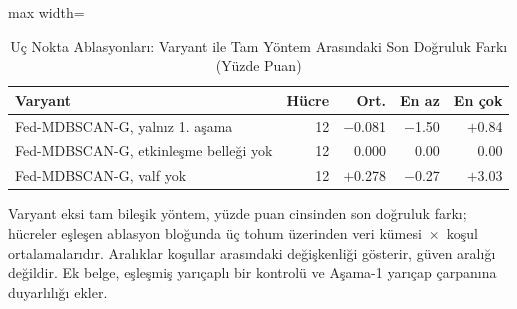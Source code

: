 \begin{table}[!t]
\centering\footnotesize
\setlength{\tabcolsep}{4pt}
\caption{Uç Nokta Ablasyonları: Varyant ile Tam Yöntem Arasındaki Son Doğruluk Farkı (Yüzde Puan)}\label{tab:ablation}
\begin{adjustbox}{max width=\columnwidth}
\begin{tabular}{lrrrr}
\toprule
Varyant & Hücre & Ort. & En az & En çok \\
\midrule
Fed-MDBSCAN-G, yalnız 1. aşama & 12 & $-$0.081 & $-$1.50 & $+$0.84 \\
Fed-MDBSCAN-G, etkinleşme belleği yok & 12 & 0.000 & 0.00 & 0.00 \\
Fed-MDBSCAN-G, valf yok & 12 & $+$0.278 & $-$0.27 & $+$3.03 \\
\bottomrule
\end{tabular}
\end{adjustbox}

\par\vspace{3pt}\parbox{\linewidth}{\footnotesize Varyant eksi tam bileşik yöntem, yüzde puan cinsinden son doğruluk farkı; hücreler eşleşen ablasyon bloğunda üç tohum üzerinden veri kümesi~$\times$~koşul ortalamalarıdır. Aralıklar koşullar arasındaki değişkenliği gösterir, güven aralığı değildir. Ek belge, eşleşmiş yarıçaplı bir kontrolü ve Aşama-1 yarıçap çarpanına duyarlılığı ekler.}
\end{table}
